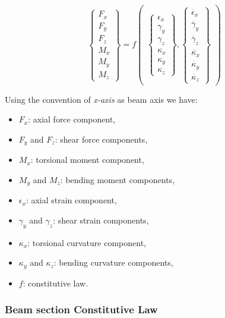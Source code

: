 \begin{equation}
	\begin{Bmatrix}
		F_x \\ F_y \\ F_z \\ M_x \\ M_y \\ M_z
	\end{Bmatrix} = f
	\begin{pmatrix}
		\begin{Bmatrix}
			\epsilon_x \\ \gamma_y \\ \gamma_z \\ \kappa_x \\ \kappa_y \\ \kappa_z
		\end{Bmatrix} , 
		\begin{Bmatrix}
			\dot{\epsilon_x} \\ \dot{\gamma_y} \\ \dot{\gamma_z} \\ \dot{\kappa_x} \\ \dot{\kappa_y} \\ \dot{\kappa_z}
		\end{Bmatrix}
	\end{pmatrix}
\end{equation}


Using the convention of \textit{x-axis} as beam axis we have:

\begin{itemize}
	\item $F_x$: axial force component,
	\item $F_y$ and $F_z$: shear force components,
	\item $M_x$: torsional moment component,
	\item $M_y$ and $M_z$: bending moment components,
	\item $\epsilon_x$: axial strain component,
	\item $\gamma_y$ and $\gamma_z$: shear strain components,
	\item $\kappa_x$: torsional curvature component,
	\item $\kappa_y$ and $\kappa_z$: bending curvature components,
	\item $f$: constitutive law.
\end{itemize}


\subsubsection{Beam section Constitutive Law}

